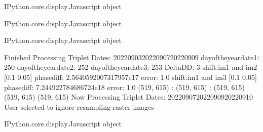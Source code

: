 \documentclass[letterpaper,10pt]{sphinxmanual}
\begin{document}
\begin{sphinxVerbatim}[commandchars=\\\{\}]
\PYGZlt{}IPython.core.display.Javascript object\PYGZgt{}
\end{sphinxVerbatim}



\begin{sphinxVerbatim}[commandchars=\\\{\}]
\PYGZlt{}IPython.core.display.Javascript object\PYGZgt{}
\end{sphinxVerbatim}



\begin{sphinxVerbatim}[commandchars=\\\{\}]
\PYGZlt{}IPython.core.display.Javascript object\PYGZgt{}
\end{sphinxVerbatim}



\begin{sphinxVerbatim}[commandchars=\\\{\}]
Finished Processing Triplet Dates:  20220903\PYGZhy{}20220907\PYGZhy{}20220909
day\PYGZus{}of\PYGZus{}the\PYGZus{}year\PYGZus{}date1:  250
\PYGZhy{}\PYGZhy{}\PYGZhy{}\PYGZhy{}\PYGZhy{}\PYGZhy{}\PYGZhy{}\PYGZhy{}\PYGZhy{}\PYGZhy{}\PYGZhy{}\PYGZhy{}\PYGZhy{}\PYGZhy{}\PYGZhy{}\PYGZhy{}\PYGZhy{}\PYGZhy{}\PYGZhy{}\PYGZhy{}\PYGZhy{}
day\PYGZus{}of\PYGZus{}the\PYGZus{}year\PYGZus{}date2:  252
\PYGZhy{}\PYGZhy{}\PYGZhy{}\PYGZhy{}\PYGZhy{}\PYGZhy{}\PYGZhy{}\PYGZhy{}\PYGZhy{}\PYGZhy{}\PYGZhy{}\PYGZhy{}\PYGZhy{}\PYGZhy{}\PYGZhy{}\PYGZhy{}\PYGZhy{}\PYGZhy{}\PYGZhy{}\PYGZhy{}\PYGZhy{}
day\PYGZus{}of\PYGZus{}the\PYGZus{}year\PYGZus{}date3:  253
\PYGZhy{}\PYGZhy{}\PYGZhy{}\PYGZhy{}\PYGZhy{}\PYGZhy{}\PYGZhy{}\PYGZhy{}\PYGZhy{}\PYGZhy{}\PYGZhy{}\PYGZhy{}\PYGZhy{}\PYGZhy{}\PYGZhy{}\PYGZhy{}\PYGZhy{}\PYGZhy{}\PYGZhy{}\PYGZhy{}\PYGZhy{}
Delta\PYGZus{}DD: 3
shift:im1 and im2 [\PYGZhy{}0.1   0.05] phasediff: \PYGZhy{}2.5640592007317957e\PYGZhy{}17 error: 1.0
shift:im1 and im3 [\PYGZhy{}0.1   0.05] phasediff: 7.244922784686724e\PYGZhy{}18 error: 1.0
(519, 615) :  (519, 615) :  (519, 615)
(519, 615)
(519, 615)
Now Processing Triplet Dates:  20220907\PYGZhy{}20220909\PYGZhy{}20220910
 User selected to ignore resampling raster images 



\PYGZlt{}IPython.core.display.Javascript object\PYGZgt{}
\end{sphinxVerbatim}
\end{document}
